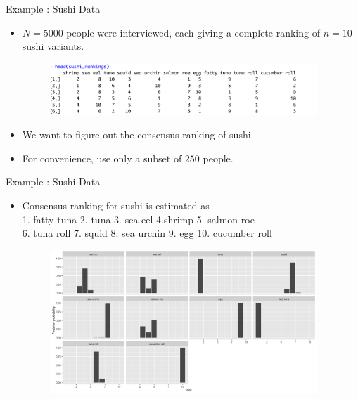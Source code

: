 \documentclass[11pt]{beamer}
\begin{document}
\begin{frame}{Example : Sushi Data}
\begin{itemize}
    \item $N=5000$ people were interviewed, each giving a complete ranking of $n=10$ sushi variants.
    \begin{figure}
        \includegraphics[width=10cm]{sushidata.png}
    \end{figure}
    \item We want to figure out the consensus ranking of sushi.
    \item For convenience, use only a subset of $250$ people.
\end{itemize}
\end{frame}

\begin{frame}{Example : Sushi Data}
\begin{itemize}
    \item Consensus ranking for sushi is estimated as \\
    1. fatty tuna    2. tuna  3. sea eel 4.shrimp 5. salmon roe \\ 6. tuna roll  7. squid   8. sea urchin 9. egg  10. cucumber roll   
    \begin{figure}
        \includegraphics[width=10cm]{Rplot_sushi.png}
    \end{figure}
\end{itemize}
\end{frame}
\end{document}
